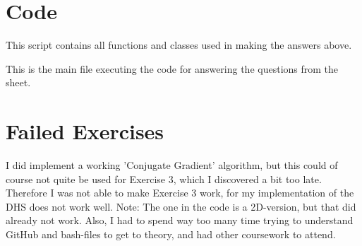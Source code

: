 \documentclass[10pt]{article}
\begin{document}
\section{Code}
This script contains all functions and classes used in making the answers above.

This is the main file executing the code for answering the questions from the sheet.


\section{Failed Exercises}
I did implement a working 'Conjugate Gradient' algorithm, but this could of course not quite be used for Exercise 3, which I discovered a bit too late. Therefore I was not able to make Exercise 3 work, for my implementation of the DHS does not work well. Note: The one in the code is a 2D-version, but that did already not work. Also, I had to spend way too many time trying to understand GitHub and bash-files to get to theory, and had other coursework to attend.
\end{document}
